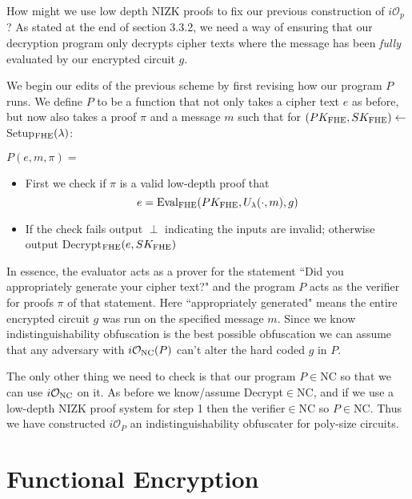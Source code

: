 \documentclass[12pt,twoside]{reedthesis}
\begin{document}
    \par How might we use low depth NIZK proofs to fix our previous construction of $i\mathcal{O}_p$? As stated at the end of section 3.3.2, we need a way of ensuring that our decryption program only decrypts cipher texts where the message has been \textit{fully} evaluated by our encrypted circuit $g$.
    \par We begin our edits of the previous scheme by first revising how our program $P$ runs. We define $P$ to be a function that not only takes a cipher text $e$ as before, but now also takes a proof $\pi$ and a message $m$ such that for $(PK_\text{FHE},SK_\text{FHE}) \leftarrow$ Setup$_\text{FHE}(\lambda)$:
    
   
   \par$P(e,m,\pi) =$
   \begin{itemize}
   \item First we check if $\pi$ is a valid low-depth proof that
   $$e =\text{Eval}_\text{FHE}(PK_\text{FHE},U_\lambda(\cdot,m),g) $$
   \item If the check fails output $\perp$ indicating the inputs are invalid; otherwise output Decrypt$_\text{FHE}(e,SK_\text{FHE})$
   \end{itemize}
    
    \par In essence, the evaluator acts as a prover for the statement ``Did you appropriately generate your cipher text?" and the program $P$ acts as the verifier for proofs $\pi$ of that statement. Here ``appropriately generated" means the entire encrypted circuit $g$ was run on the specified message $m$. Since we know indistinguishability obfuscation is the best possible obfuscation we can assume that any adversary with $i\mathcal{O}_\text{NC}(P)$ can't alter the hard coded $g$ in $P$.
    \par The only other thing we need to check is that our program $P\in$NC so that we can use $i\mathcal{O}_\text{NC}$ on it. As before we know/assume Decrypt$\in$NC, and if we use a low-depth NIZK proof system for step 1 then the verifier$\in$NC so $P\in$NC. Thus we have constructed $i\mathcal{O}_P$ an indistinguishability obfuscater for poly-size circuits.
    
    \chapter{Functional Encryption}
\end{document}
